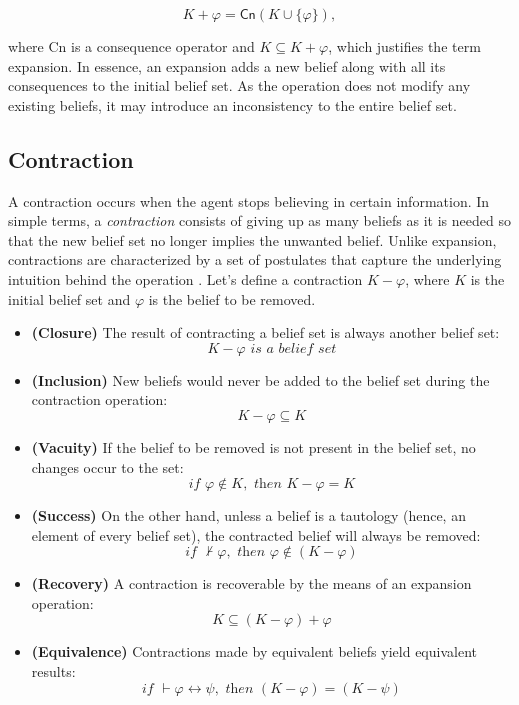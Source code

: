 $$K + \varphi = \textsf{Cn}(K \cup \{ \varphi \}),$$

where \textsf{Cn} is a consequence operator and $K \subseteq K + \varphi$, which justifies the term expansion. In essence, an expansion adds a new belief along with all its consequences to the initial belief set. As the operation does not modify any existing beliefs, it may introduce an inconsistency to the entire belief set.

\subsection{Contraction}
\label{subsec:contraction}

A contraction occurs when the agent stops believing in certain information. In simple terms, a \textit{contraction} consists of giving up as many beliefs as it is needed so that the new belief set no longer implies the unwanted belief. Unlike expansion, contractions are characterized by a set of postulates that capture the underlying intuition behind the operation \citep{Wassermann2000}. Let's define a contraction $K - \varphi$, where $K$ is the initial belief set and $\varphi$ is the belief to be removed.

\begin{itemize}
    \item[] \textbf{(Closure)} The result of contracting a belief set is always another belief set:
    $$K - \varphi \textit{ is a belief set}$$

    \item[] \textbf{(Inclusion)} New beliefs would never be added to the belief set during the contraction operation:
    $$K - \varphi \subseteq K$$
    
    \item[] \textbf{(Vacuity)} If the belief to be removed is not present in the belief set, no changes occur to the set:
    $$\textit{if } \varphi \not \in K, \textit{ then } K - \varphi = K$$
    
    \item[] \textbf{(Success)} On the other hand, unless a belief is a tautology (hence, an element of every belief set), the contracted belief will always be removed:
    $$\textit{if } \nvdash \varphi, \textit{ then } \varphi \notin (K - \varphi)$$
    
    \item[] \textbf{(Recovery)} A contraction is recoverable by the means of an expansion operation:
    $$K \subseteq (K - \varphi) + \varphi$$
    
    \item[] \textbf{(Equivalence)} Contractions made by equivalent beliefs yield equivalent results:
    $$\textit{if } \vdash \varphi \leftrightarrow \psi, \textit{ then } (K - \varphi) = (K - \psi)$$
\end{itemize}

